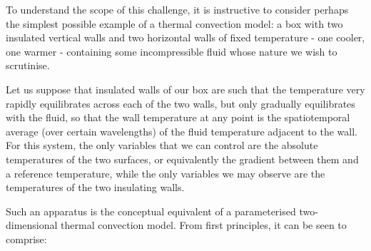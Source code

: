 \documentclass[a4paper,11pt,oneside]{book}
\begin{document}
To understand the scope of this challenge, it is instructive to consider perhaps the simplest possible example of a thermal convection model: a box with two insulated vertical walls and two horizontal walls of fixed temperature - one cooler, one warmer - containing some incompressible fluid whose nature we wish to scrutinise.

Let us suppose that insulated walls of our box are such that the temperature very rapidly equilibrates across each of the two walls, but only gradually equilibrates with the fluid, so that the wall temperature at any point is the spatiotemporal average (over certain wavelengths) of the fluid temperature adjacent to the wall. For this system, the only variables that we can control are the absolute temperatures of the two surfaces, or equivalently the gradient between them and a reference temperature, while the only variables we may observe are the temperatures of the two insulating walls.

Such an apparatus is the conceptual equivalent of a parameterised two-dimensional thermal convection model. From first principles, it can be seen to comprise:
\end{document}
